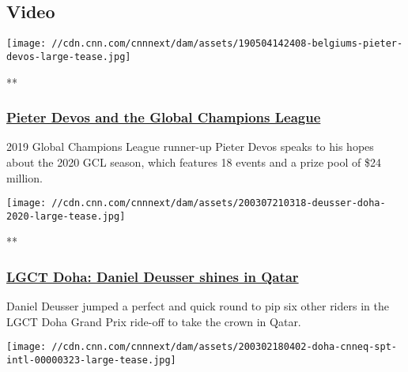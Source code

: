 \hypertarget{video-}{%
\subsection{Video~}\label{video-}}

\href{/videos/sports/2020/03/10/pieter-devos-global-champions-league-explainer-st-tropez-pirates-cnneq-vision-spt-intl.cnn}{}

\texttt{[image: //cdn.cnn.com/cnnnext/dam/assets/190504142408-belgiums-pieter-devos-large-tease.jpg]}

**

\hypertarget{pieter-devos-and-the-global-champions-league}{%
\subsubsection{\texorpdfstring{\href{/videos/sports/2020/03/10/pieter-devos-global-champions-league-explainer-st-tropez-pirates-cnneq-vision-spt-intl.cnn}{Pieter
Devos and the Global Champions
League}}{Pieter Devos and the Global Champions League}}\label{pieter-devos-and-the-global-champions-league}}

2019 Global Champions League runner-up Pieter Devos speaks to his hopes
about the 2020 GCL season, which features 18 events and a prize pool of
\$24 million.

\href{/videos/sports/2020/03/09/doha-longines-global-champions-tour-review-daniel-deusser-cnneq-vision-2020-spt-intl.cnn}{}

\texttt{[image: //cdn.cnn.com/cnnnext/dam/assets/200307210318-deusser-doha-2020-large-tease.jpg]}

**

\hypertarget{lgct-doha-daniel-deusser-shines-in-qatar}{%
\subsubsection{\texorpdfstring{\href{/videos/sports/2020/03/09/doha-longines-global-champions-tour-review-daniel-deusser-cnneq-vision-2020-spt-intl.cnn}{LGCT
Doha: Daniel Deusser shines in
Qatar}}{LGCT Doha: Daniel Deusser shines in Qatar}}\label{lgct-doha-daniel-deusser-shines-in-qatar}}

Daniel Deusser jumped a perfect and quick round to pip six other riders
in the LGCT Doha Grand Prix ride-off to take the crown in Qatar.

\href{/videos/sports/2020/03/02/doha-cnneq-spt-intl.cnn}{}

\texttt{[image: //cdn.cnn.com/cnnnext/dam/assets/200302180402-doha-cnneq-spt-intl-00000323-large-tease.jpg]}

